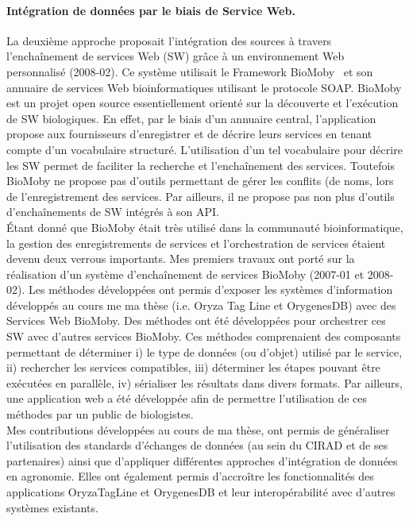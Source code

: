 \paragraph*{Intégration de données par le biais de Service Web.} La deuxième approche proposait l’intégration des sources à travers l’enchaînement de services Web (SW) grâce à un environnement Web personnalisé (2008-02). Ce système utilisait le Framework BioMoby~\cite{Wilkinson2002a,Wilkinson2005a}  et son annuaire de services Web bioinformatiques utilisant le protocole SOAP. BioMoby est un projet open source essentiellement orienté sur la découverte et l’exécution de SW biologiques. En effet, par le biais d’un annuaire central, l’application propose aux fournisseurs d’enregistrer et de décrire leurs services en tenant compte d’un vocabulaire structuré. L’utilisation d’un tel vocabulaire pour décrire les SW permet de faciliter la recherche et l’enchaînement des services. Toutefois BioMoby ne propose pas d’outils permettant de gérer les conflits (de noms, lors de l'enregistrement des services. Par ailleurs, il ne propose pas non plus d'outils d’enchaînements de SW intégrés à son API. \\
Étant donné que BioMoby était très utilisé dans la communauté bioinformatique, la gestion des enregistrements de services et l'orchestration de services étaient devenu deux verrous importants. Mes premiers travaux ont porté sur la réalisation d'un système d'enchaînement de services BioMoby (2007-01 et 2008-02). Les méthodes développées ont permis d'exposer les systèmes d'information développés au cours me ma thèse (i.e. Oryza Tag Line et OrygenesDB) avec des Services Web BioMoby. Des méthodes ont été développées pour orchestrer ces SW avec d'autres services BioMoby. Ces méthodes comprenaient des composants permettant de déterminer i) le type de données (ou d'objet) utilisé par le service, ii) rechercher les services compatibles, iii) déterminer les étapes pouvant être exécutées en parallèle,  iv) sérialiser les résultats dans divers formats. Par ailleurs, une application web a été développée afin de permettre l'utilisation de ces méthodes par un public de biologistes. \\

Mes contributions développées au cours de ma thèse, ont permis de généraliser l’utilisation des standards d’échanges de données (au sein du CIRAD et de ses partenaires) ainsi que d’appliquer différentes approches d’intégration de données en agronomie. Elles ont également permis d’accroître les fonctionnalités des applications OryzaTagLine et OrygenesDB et leur interopérabilité avec d’autres systèmes existants.

